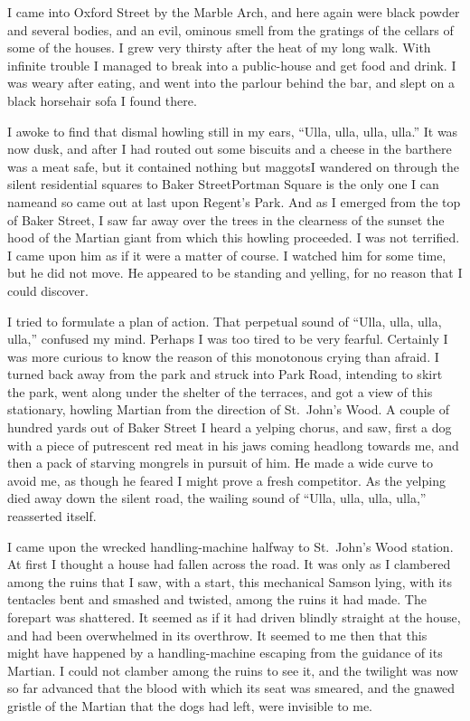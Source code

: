 I came into Oxford Street by the Marble Arch, and here again were
black powder and several bodies, and an evil, ominous smell from
the gratings of the cellars of some of the houses. I grew very
thirsty after the heat of my long walk. With infinite trouble I
managed to break into a public-house and get food and drink. I was
weary after eating, and went into the parlour behind the bar, and
slept on a black horsehair sofa I found there.

I awoke to find that dismal howling still in my ears, ``Ulla, ulla,
ulla, ulla.'' It was now dusk, and after I had routed out some
biscuits and a cheese in the bar\dash{}there was a meat safe, but it
contained nothing but maggots\dash{}I wandered on through the silent
residential squares to Baker Street\dash{}Portman Square is the only one
I can name\dash{}and so came out at last upon Regent's Park. And as I
emerged from the top of Baker Street, I saw far away over the trees
in the clearness of the sunset the hood of the Martian giant from
which this howling proceeded. I was not terrified. I came upon him
as if it were a matter of course. I watched him for some time, but
he did not move. He appeared to be standing and yelling, for no
reason that I could discover.

I tried to formulate a plan of action. That perpetual sound of
``Ulla, ulla, ulla, ulla,'' confused my mind. Perhaps I was too tired
to be very fearful. Certainly I was more curious to know the reason
of this monotonous crying than afraid. I turned back away from the
park and struck into Park Road, intending to skirt the park, went
along under the shelter of the terraces, and got a view of this
stationary, howling Martian from the direction of St.\ John's Wood.
A couple of hundred yards out of Baker Street I heard a yelping
chorus, and saw, first a dog with a piece of putrescent red meat in
his jaws coming headlong towards me, and then a pack of starving
mongrels in pursuit of him. He made a wide curve to avoid me, as
though he feared I might prove a fresh competitor. As the yelping
died away down the silent road, the wailing sound of ``Ulla, ulla,
ulla, ulla,'' reasserted itself.

I came upon the wrecked handling-machine halfway to St.\ John's Wood
station. At first I thought a house had fallen across the road. It
was only as I clambered among the ruins that I saw, with a start,
this mechanical Samson lying, with its tentacles bent and smashed
and twisted, among the ruins it had made. The forepart was
shattered. It seemed as if it had driven blindly straight at the
house, and had been overwhelmed in its overthrow. It seemed to me
then that this might have happened by a handling-machine escaping
from the guidance of its Martian. I could not clamber among the
ruins to see it, and the twilight was now so far advanced that the
blood with which its seat was smeared, and the gnawed gristle of
the Martian that the dogs had left, were invisible to me.

